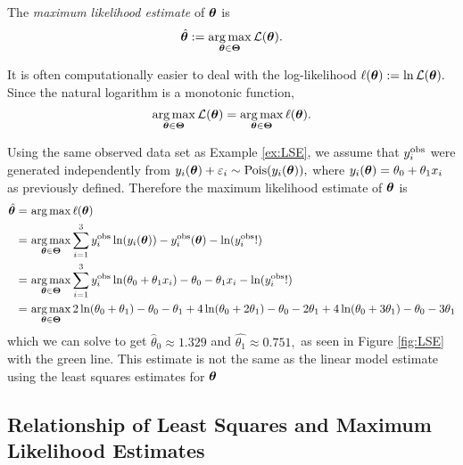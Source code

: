 \begin{definition}
    The \emph{maximum likelihood estimate} of $\bm{\theta}$ is
    $$
        \hat{\bm{\theta}}
        := \operatorname*{arg\,max}_{\bm{\theta}\in\mathbf{\Theta}} \mathcal{L}(\bm{\theta}).
    $$
\end{definition}

It is often computationally easier to deal with the log-likelihood
$\ell(\bm{\theta}) := \ln\mathcal{L}(\bm{\theta}).$ Since the natural
logarithm is a monotonic function,
$$
    \operatorname*{arg\,max}_{\bm{\theta}\in\mathbf{\Theta}} \mathcal{L}(\bm{\theta})
    = \operatorname*{arg\,max}_{\bm{\theta}\in\mathbf{\Theta}} \ell(\bm{\theta}).
$$

\begin{example}
    Using the same observed data set as Example \ref{ex:LSE}, we assume that
    $y_i^{\mathrm{obs}}$ were generated independently from
    $y_i(\bm{\theta}) + \varepsilon_i \sim \operatorname{Pois}(y_i(\bm{\theta})),$ where
    $y_i(\bm{\theta}) = \theta_0 + \theta_1x_i$ as previously defined. Therefore
    the maximum likelihood estimate of $\bm{\theta}$ is
    \begin{align*}
        \hat{\bm{\theta}}
        = & \, \operatorname*{arg\,max} \ell(\bm{\theta})                                  \\
        = & \, \operatorname*{arg\,max}_{\bm{\theta}\in\mathbf{\Theta}}\sum_{i = 1}^{3}
        y_i^{\mathrm{obs}}\ln(y_i(\bm{\theta})) -y_i^{\mathrm{obs}}(\bm{\theta}) - \ln(y_i^{\mathrm{obs}}!) \\
        = & \, \operatorname*{arg\,max}_{\bm{\theta}\in\mathbf{\Theta}}\sum_{i = 1}^{3}
        y_i^{\mathrm{obs}}\ln(\theta_0 + \theta_1x_i)
        - \theta_0 - \theta_1x_i
        - \ln(y_i^{\mathrm{obs}}!)                                              \\
        = & \, \operatorname*{arg\,max}_{\bm{\theta}\in\mathbf{\Theta}}
        2\ln(\theta_0 + \theta_1) - \theta_0 - \theta_1
        + 4\ln(\theta_0 + 2\theta_1) - \theta_0 - 2\theta_1
        + 4\ln(\theta_0 + 3\theta_1) - \theta_0 - 3\theta_1
    \end{align*}
    which we can solve to get $\hat{\theta}_0 \approx 1.329$
    and $\hat{\theta_1} \approx 0.751,$ as seen in Figure \ref{fig:LSE} with
    the green line. This estimate is not the same as the linear model
    estimate using the least squares estimates for $\bm{\theta}$
\end{example}

\subsection*{Relationship of Least Squares and Maximum Likelihood Estimates}

